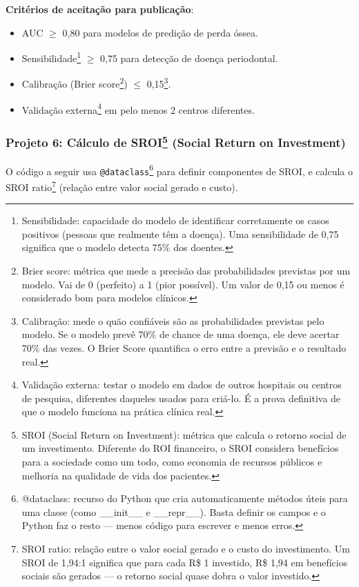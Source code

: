 \textbf{Critérios de aceitação para publicação}:
\begin{itemize}
    \item AUC $\ge$ 0,80 para modelos de predição de perda óssea.
    \item Sensibilidade\protect\footnote{Sensibilidade: capacidade do modelo de identificar corretamente os casos positivos (pessoas que realmente têm a doença). Uma sensibilidade de 0,75 significa que o modelo detecta 75\% dos doentes.} $\ge$ 0,75 para detecção de doença periodontal.
    \item Calibração (Brier score\protect\footnote{Brier score: métrica que mede a precisão das probabilidades previstas por um modelo. Vai de 0 (perfeito) a 1 (pior possível). Um valor de 0,15 ou menos é considerado bom para modelos clínicos.}) $\le$ 0,15\protect\footnote{Calibração: mede o quão confiáveis são as probabilidades previstas pelo modelo. Se o modelo prevê 70\% de chance de uma doença, ele deve acertar 70\% das vezes. O Brier Score quantifica o erro entre a previsão e o resultado real.}.
    \item Validação externa\protect\footnote{Validação externa: testar o modelo em dados de outros hospitais ou centros de pesquisa, diferentes daqueles usados para criá-lo. É a prova definitiva de que o modelo funciona na prática clínica real.} em pelo menos 2 centros diferentes.
\end{itemize}

\subsubsection*{Projeto 6: Cálculo de SROI\protect\footnote{SROI (Social Return on Investment): métrica que calcula o retorno social de um investimento. Diferente do ROI financeiro, o SROI considera benefícios para a sociedade como um todo, como economia de recursos públicos e melhoria na qualidade de vida dos pacientes.} (Social Return on Investment)}

O código a seguir usa \texttt{@dataclass}\protect\footnote{@dataclass: recurso do Python que cria automaticamente métodos úteis para uma classe (como \_\_init\_\_ e \_\_repr\_\_). Basta definir os campos e o Python faz o resto --- menos código para escrever e menos erros.} para definir componentes de SROI, e calcula o SROI ratio\protect\footnote{SROI ratio: relação entre o valor social gerado e o custo do investimento. Um SROI de 1,94:1 significa que para cada R\$ 1 investido, R\$ 1,94 em benefícios sociais são gerados --- o retorno social quase dobra o valor investido.} (relação entre valor social gerado e custo).

